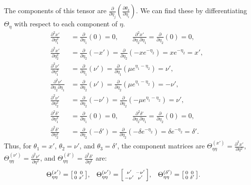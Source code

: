 \documentclass{article}
\begin{document}
The components of this tensor are $\frac{\partial}{\partial \eta_j} \left( \frac{\partial \theta_k}{\partial \eta_i} \right)$.
We can find these by differentiating $\Theta_\eta$ with respect to each component of $\eta$.
%
\begin{align}
  \frac{\partial^2 x'}{\partial \eta_1^2}                 & = \frac{\partial}{\partial \eta_1}(0)   = 0, \qquad \frac{\partial^2 x'}{\partial \eta_2 \partial \eta_1} = \frac{\partial}{\partial \eta_2}(0) = 0,    \\
  \frac{\partial^2 x'}{\partial \eta_2^2}                 & = \frac{\partial}{\partial \eta_2}(-x') = \frac{\partial}{\partial \eta_2}(-x e^{-\eta_2}) = x e^{-\eta_2} = x',                                        \\
  \frac{\partial^2 \nu'}{\partial \eta_1^2}               & = \frac{\partial}{\partial \eta_1}(\nu') = \frac{\partial}{\partial \eta_1}(\mu e^{\eta_1 - \eta_2}) = \nu',                                            \\
  \frac{\partial^2 \nu'}{\partial \eta_2 \partial \eta_1} & = \frac{\partial}{\partial \eta_2}(\nu') = \frac{\partial}{\partial \eta_2}(\mu e^{\eta_1 - \eta_2}) = -\nu',                                           \\
  \frac{\partial^2 \nu'}{\partial \eta_2^2}               & = \frac{\partial}{\partial \eta_2}(-\nu') = \frac{\partial}{\partial \eta_2}(-\mu e^{\eta_1 - \eta_2}) = \nu',                                          \\
  \frac{\partial^2 \delta'}{\partial \eta_1^2}            & = \frac{\partial}{\partial \eta_1}(0) = 0, \qquad \frac{\partial^2 \delta'}{\partial \eta_2 \partial \eta_1} = \frac{\partial}{\partial \eta_2}(0) = 0, \\
  \frac{\partial^2 \delta'}{\partial \eta_2^2}            & = \frac{\partial}{\partial \eta_2}(-\delta') = \frac{\partial}{\partial \eta_2}(-\delta e^{-\eta_2}) = \delta e^{-\eta_2} = \delta'.
\end{align}
%
Thus, for $\theta_1 = x'$, $\theta_2 = \nu'$, and $\theta_3 = \delta'$, the component matrices are $\Theta_{\eta\eta}^{(x')} = \frac{\partial^2 x'}{\partial \eta^2}$, $\Theta_{\eta\eta}^{(\nu')} = \frac{\partial^2 \nu'}{\partial \eta^2}$, and $\Theta_{\eta\eta}^{(\delta')} = \frac{\partial^2 \delta'}{\partial \eta^2}$ are:
%
\begin{align}
  \Theta_{\eta\eta}^{(x')}      & = \begin{bsmallmatrix} 0 & 0 \\ 0 & x' \end{bsmallmatrix}, &
  \Theta_{\eta\eta}^{(\nu')}    & = \begin{bsmallmatrix} \nu' & -\nu' \\ -\nu' & \nu' \end{bsmallmatrix}, &
  \Theta_{\eta\eta}^{(\delta')} & = \begin{bsmallmatrix} 0 & 0 \\ 0 & \delta' \end{bsmallmatrix}.
\end{align}
\end{document}
